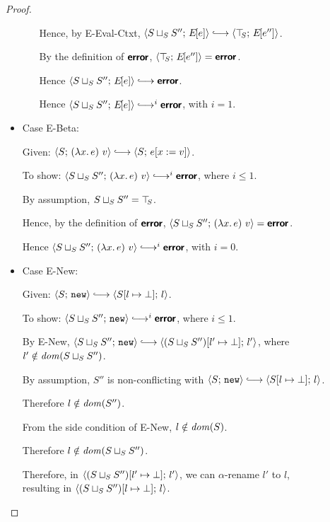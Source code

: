 \begin{proof}
\begin{itemize}
\begin{itemize}
          Hence, by {\sc E-Eval-Ctxt},
          $\config{\lubstore{S}{S''}}{\E{e}} \parstepsto
          \config{\topS}{\E{e''}}$.

          By the definition of $\textbf{\textsf{error}}$, $\langle \top\hspace{-0.85mm}_{S};\, E\hspace{-1mm}\left[e''\right] \rangle =
          \textbf{\textsf{error}}$.

          Hence $\config{\lubstore{S}{S''}}{\E{e}} \parstepsto
          \error$.

          Hence $\config{\lubstore{S}{S''}}{\E{e}} \parstepsto^i
          \error$, with $i = 1$.

      \end{itemize}

    \item Case {\sc E-Beta}:

      Given: $\config{S}{\app{(\lam{x}{e})}{v}} \parstepsto
      \config{S}{\subst{e}{x}{v}}$.

      To show: $\config{\lubstore{S}{S''}}{\app{(\lam{x}{e})}{v}}
      \parstepsto^i \error$, where $i \leq 1$.

      By assumption, $S \sqcup_{S} S'' = \top\hspace{-0.85mm}_{S}$.

      Hence, by the definition of $\textbf{\textsf{error}}$,
      $\langle S \sqcup_{S} S'';\, (\lambda x.\,e)~v \rangle = \textbf{\textsf{error}}$.

      Hence $\config{\lubstore{S}{S''}}{\app{(\lam{x}{e})}{v}}
      \parstepsto^i \error$, with $i = 0$.

    \item Case {\sc E-New}:

      Given: $\config{S}{\NEW} \parstepsto
      \config{\extSRaw{S}{l}{\bot}}{l}$.

      To show: $\config{\lubstore{S}{S''}}{\NEW} \parstepsto^i
      \error$, where $i \leq 1$.

      By {\sc E-New}, $\config{\lubstore{S}{S''}}{\NEW} \parstepsto
      \config{\extSRaw{(\lubstore{S}{S''})}{l'}{\bot}}{l'}$, where $l'
      \notin \mathit{dom}(S \sqcup_{S} S'')$.

      By assumption, $S''$ is non-conflicting with $\config{S}{\NEW}
      \parstepsto \config{\extSRaw{S}{l}{\bot}}{l}$.
 
      Therefore $l \notin \mathit{dom}(S'')$.

      From the side condition of {\sc E-New}, $l \notin \mathit{dom}(S)$.

      Therefore $l \notin \mathit{dom}(S \sqcup_{S} S'')$.

      Therefore, in
      $\langle (S \sqcup_{S} S'')[l' \mapsto \bot];\, l' \rangle$, we can
      $\alpha$-rename $l'$ to $l$, \\ resulting in
      $\langle (S \sqcup_{S} S'')[l \mapsto \bot];\, l \rangle$.


\end{itemize}
\end{proof}
